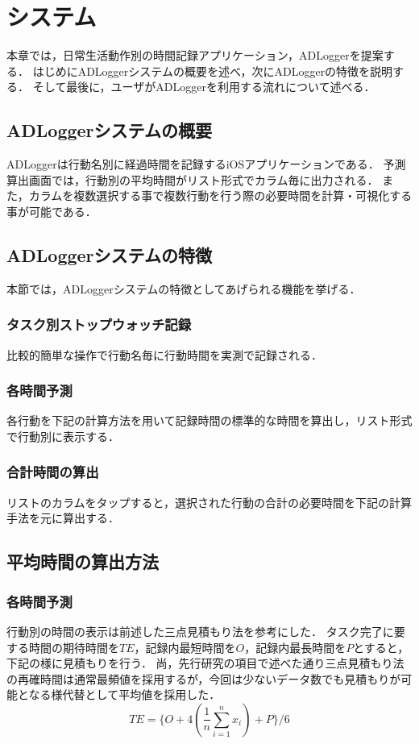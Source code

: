 \chapter{システム}
本章では，日常生活動作別の時間記録アプリケーション，ADLoggerを提案する．
はじめにADLoggerシステムの概要を述べ，次にADLoggerの特徴を説明する．
そして最後に，ユーザがADLoggerを利用する流れについて述べる．

\section{ADLoggerシステムの概要}
ADLoggerは行動名別に経過時間を記録するiOSアプリケーションである．
予測算出画面では，行動別の平均時間がリスト形式でカラム毎に出力される．
また，カラムを複数選択する事で複数行動を行う際の必要時間を計算・可視化する事が可能である．

\section{ADLoggerシステムの特徴}
本節では，ADLoggerシステムの特徴としてあげられる機能を挙げる．
\subsection{タスク別ストップウォッチ記録}
比較的簡単な操作で行動名毎に行動時間を実測で記録される．
\subsection{各時間予測}
各行動を下記の計算方法を用いて記録時間の標準的な時間を算出し，リスト形式で行動別に表示する．
\subsection{合計時間の算出}
リストのカラムをタップすると，選択された行動の合計の必要時間を下記の計算手法を元に算出する．

\section{平均時間の算出方法}
\subsection{各時間予測}
行動別の時間の表示は前述した三点見積もり法を参考にした．
タスク完了に要する時間の期待時間を$TE$，記録内最短時間を$O$，記録内最長時間を$P$とすると，下記の様に見積もりを行う．
尚，先行研究の項目で述べた通り三点見積もり法の再確時間は通常最頻値を採用するが，今回は少ないデータ数でも見積もりが可能となる様代替として平均値を採用した．
\[ TE=\{ O + 4(\frac{1}{n}\displaystyle\sum_{i=1}^{n}x_{i}) + P\}/6\]

